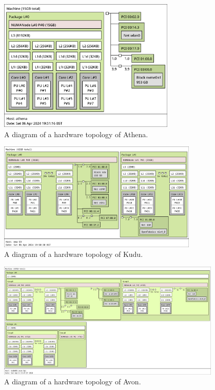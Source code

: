 \begin{figure}[H]
    \centering
    \includegraphics[width=0.75\textwidth]{images/5_performance/athena-topology.png}
    \caption{A diagram of a hardware topology of Athena.}
    \label{fig:athena-topology}
\end{figure}

\begin{figure}[H]
    \centering
    \includegraphics[width=0.85\textwidth]{images/5_performance/kudu-topology.png}
    \caption{A diagram of a hardware topology of Kudu.}
    \label{fig:kudu-topology}
\end{figure}

\begin{figure}[H]
    \centering
    \includegraphics[width=0.95\textwidth]{images/5_performance/avon-topology.png}
    \caption{A diagram of a hardware topology of Avon.}
    \label{fig:avon-topology}
\end{figure}

